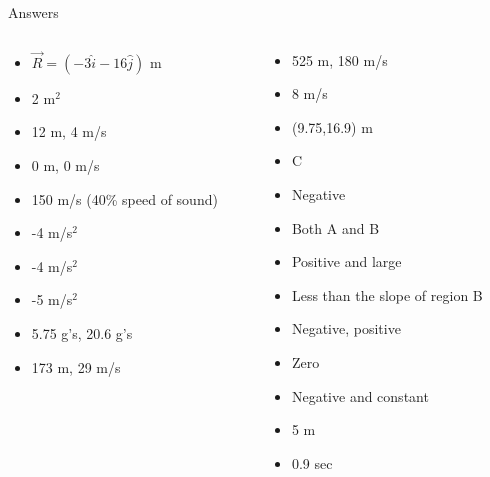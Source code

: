 \documentclass{beamer}
\begin{document}
\begin{frame}{Answers}
\begin{columns}[T]
\begin{column}{0.5\textwidth}
\begin{itemize}
\item $\vec{R} =  (-3\hat{i}-16\hat{j})$ m
\item 2 m$^2$
\item 12 m, 4 m/s
\item 0 m, 0 m/s
\item 150 m/s (40\% speed of sound)
\item -4 m/s$^2$
\item -4 m/s$^2$
\item -5 m/s$^2$
\item  5.75 g's, 20.6 g's
\item 173 m, 29 m/s
\end{itemize}
\end{column}
\begin{column}{0.5\textwidth}
\begin{itemize}
\item 525 m, 180 m/s
\item 8 m/s
\item (9.75,16.9) m
\item C
\item Negative
\item Both A and B
\item Positive and large
\item Less than the slope of region B
\item Negative, positive
\item Zero
\item Negative and constant
\item 5 m
\item 0.9 sec
\end{itemize}
\end{column}
\end{columns}
\end{frame}
\end{document}
